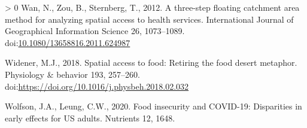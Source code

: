 \documentclass[]{elsarticle} %
\newlength{\cslhangindent}
\newenvironment{CSLReferences}[3] %
 {%
  \setlength{\parindent}{0pt}
  \ifodd #1 \everypar{\setlength{\hangindent}{\cslhangindent}}\ignorespaces\fi
  \ifnum #2 > 0
  \setlength{\parskip}{#2\baselineskip}
  \fi
 }%
 {}
\begin{document}
\begin{CSLReferences}{1}{0}
\leavevmode\hypertarget{ref-wan2012three}{}%
Wan, N., Zou, B., Sternberg, T., 2012. A three-step floating catchment
area method for analyzing spatial access to health services.
International Journal of Geographical Information Science 26,
1073--1089.
doi:\href{https://doi.org/10.1080/13658816.2011.624987}{10.1080/13658816.2011.624987}

\leavevmode\hypertarget{ref-widener2018spatial}{}%
Widener, M.J., 2018. Spatial access to food: Retiring the food desert
metaphor. Physiology \& behavior 193, 257--260.
doi:\url{https://doi.org/10.1016/j.physbeh.2018.02.032}

\leavevmode\hypertarget{ref-wolfson2020food}{}%
Wolfson, J.A., Leung, C.W., 2020. Food insecurity and COVID-19:
Disparities in early effects for US adults. Nutrients 12, 1648.

\end{CSLReferences}
\end{document}
